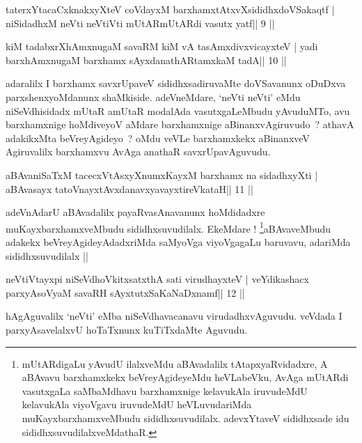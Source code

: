 
\begin{shl}
taterxYtacaCxknakxyXteV coVdayxM barxhamxtAtxvXsididhxdoVSakaqtf |
niSidadhxM neVti neVtiVti mUtARmUtARdi vasutx yatf\hfill || 9 ||
\end{shl}

\begin{shl}
kiM tadabxrXhAmxnugaM savaRM kiM vA tasAmxdivxvicayxteV |
yadi barxhAmxnugaM barxhamx sAyxdanathARtamxkaM tadA\hfill || 10 ||
\end{shl}

\begin{artha}
adaralilx I barxhamx savxrUpaveV sididhxsadiruvaMte doVSavanunx
oDuDxva parxshenxyoMdanunx shaMkiside. adeVneMdare, `neVti neVti' eMdu
niSeVdhisidadx mUtaR amUtaR modalAda vasutxgaLeMbudu yAvuduMTo, avu
barxhamxnige hoMdiveyoV aMdare barxhamxnige aBinanxvAgiruvudo~?
athavA adakikxMta beVreyAgideyo~? oMdu veVLe barxhamxkekx  aBinanxveV
Agiruvalilx barxhamxvu AvAga anathaR savxrUpavAguvudu. 
\end{artha}

\begin{shl}
aBAvaniSaTxM tacecxVtAsxyXnumxKayxM barxhamx na sidadhxyXti |
aBAvasayx tatoV\s nayxtAvxdanavxyavayxtireVkataH\hfill || 11 ||
\end{shl}

\begin{artha}
adeVnAdarU aBAvadalilx payaRvasAnavanunx hoMdidadxre
muKayxbarxhamxveMbudu sididhxsuvudilalx. EkeMdare
! \footnote[1]{mUtARdigaLu yAvudU ilalxveMdu aBAvadalilx
  tAtapxyaRvidadxre, A aBAvavu barxhamxkekx beVreyAgideyeMdu
  heVLabeVku, AvAga mUtARdi vasutxgaLa saMbaMdhavu barxhamxnige
  kelavukAla iruvudeMdU kelavukAla viyoVgavu iruvudeMdU heVLuvudariMda
  muKayxbarxhamxveMbudu sididhxsuvudilalx. adevxYtaveV sididhxsade idu
  sididhxsuvudilalxveMdathaR.}aBAvaveMbudu adakekx beVreyAgideyAdadxriMda saMyoVga
viyoVgagaLu baruvavu, adariMda sididhxsuvudilalx ||
\end{artha}

\begin{shl}
neVtiVtayxpi niSeVdhoVkitxsatxthA sati virudhayxteV |
veYdikashacx parxyAsoV\s yaM savaRH sAyxtutxSaKaNaDxnamf\hfill || 12 ||
\end{shl}

\begin{artha}
hAgAguvalilx `neVti' eMba niSeVdhavacanavu virudadhxvAguvudu. veVdada I parxyAsavelalxvU hoTaTxnunx kuTiTxdaMte Aguvudu.
\end{artha}

